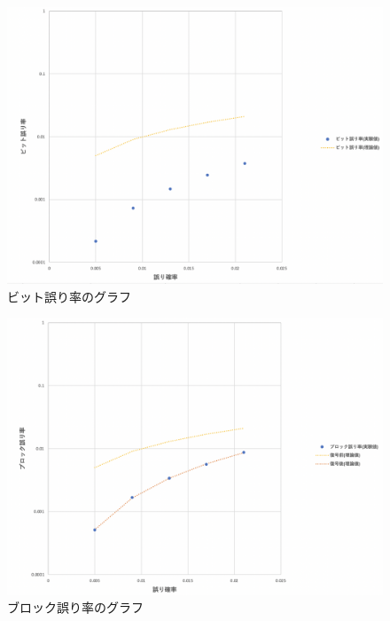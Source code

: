 \documentclass[12pt]{jarticle}
\begin{document}
\begin{figure}[h]
    \begin{center}
        \includegraphics[scale=0.25]{kadai3_3_4.png}
    \end{center}
    \caption{ビット誤り率のグラフ}
\end{figure}

\clearpage

\begin{figure}[h]
    \begin{center}
        \includegraphics[scale=0.25]{kadai3_3_5.png}
    \end{center}
    \caption{ブロック誤り率のグラフ}
\end{figure}
\end{document}
